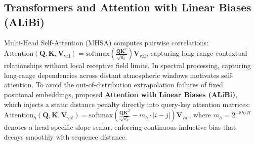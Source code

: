 \subsection{Transformers and Attention with Linear Biases (ALiBi)}
Multi-Head Self-Attention (MHSA) \citep{vaswani2017attention} computes pairwise correlations: $\text{Attention}(\mathbf{Q}, \mathbf{K}, \mathbf{V}_\text{val}) = \text{softmax}(\frac{\mathbf{Q} \mathbf{K}^T}{\sqrt{d_k}}) \mathbf{V}_\text{val}$, capturing long-range contextual relationships without local receptive field limits. In spectral processing, capturing long-range dependencies across distant atmospheric windows motivates self-attention. To avoid the out-of-distribution extrapolation failures of fixed positional embeddings, \citet{press2022train} proposed \textbf{Attention with Linear Biases (ALiBi)}, which injects a static distance penalty directly into query-key attention matrices: $\text{Attention}_h(\mathbf{Q}, \mathbf{K}, \mathbf{V}_\text{val}) = \text{softmax}(\frac{\mathbf{Q} \mathbf{K}^T}{\sqrt{d_k}} - m_h \cdot |i - j|) \mathbf{V}_\text{val}$, where $m_h = 2^{-8h/H}$ denotes a head-specific slope scalar, enforcing continuous inductive bias that decays smoothly with sequence distance.
